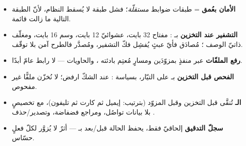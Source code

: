 \begin{summary}
\begin{itemize}
\item \textbf{الأمان بعُمق} = طبقات ضوابط \emph{مستقلّة}؛ فشل طبقة لا يُسقط النظام،
  لأنّ الطبقة التالية ما زالت قائمة.
\item \textbf{التشفير عند التخزين} بـ : مفتاح 32 بايت، 
  عشوائيّ 12 بايت، وسم 16 بايت، ومغلّف ذاتيّ الوصف ؛ مُصادَق فأيّ عبثٍ
  يُفشِل فكّ التشفير، ومُصدَّر  فالطرح آمن بلا توقّف.
\item \textbf{رفع الملفّات} عبر منفذٍ بمزوّدَين ومسارٍ مُعتِم بادئته ،
  والحاويات  — لا رابط عامّ أبدًا.
\item \textbf{الفحص قبل التخزين} بـ  على التيّار، بسياسة :
  عند الشكّ ارفض؛ لا نُخزّن ملفًّا غير مفحوص.
\item \textbf{الـ } تُنقَّى قبل التخزين وقبل المزوّد (بترتيب: إيميل ثم كارت
  ثم تليفون)، مع تخصيصٍ بلا بيانات تواصُل، ومراجع فضفاضة، وتصدير/حذف .
\item \textbf{سجلّ التدقيق}  إلحاقيّ فقط، يحفظ الحالة قبل/بعد
  بـ  — أثرٌ لا يُزوَّر لكلّ فعلٍ حسّاس.
\end{itemize}
\end{summary}
